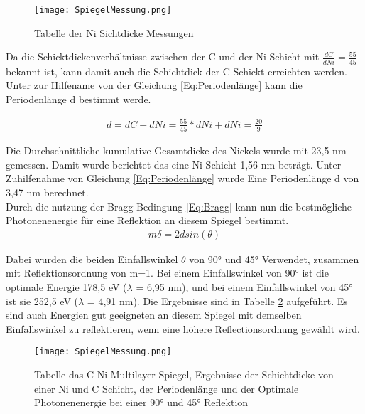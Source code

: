 \begin{figure}[h]
 \centering
 \texttt{[image: SpiegelMessung.png]}
 \caption[Tabelle C-Ni Spiegel]{Tabelle der Ni Sichtdicke Messungen}
 \label{fig:TabelleSpiegelMessung}
\end{figure}

Da die Schicktdickenverhältnisse zwischen der C und der Ni Schicht mit $\displaystyle\frac{dC}{dNi} = \displaystyle\frac{55}{45}$ bekannt ist, kann damit auch die Schichtdick der C Schickt erreichten werden. Unter zur Hilfename von der Gleichung \ref{Eq:Periodenlänge} kann die Periodenlänge d bestimmt werde.

\begin{align}
\label{Eq:Periodenlänge}
  d = dC + dNi =  \displaystyle\frac{55}{45}*dNi+dNi = \displaystyle\frac{20}{9}
\end{align}

Die Durchschnittliche kumulative Gesamtdicke des Nickels wurde mit 23,5 nm gemessen. Damit wurde berichtet das eine Ni Schicht 1,56 nm beträgt. Unter Zuhilfenahme von Gleichung \ref{Eq:Periodenlänge} wurde Eine Periodenlänge d von 3,47 nm berechnet.\\
Durch die nutzung der Bragg Bedingung \ref{Eq:Bragg} kann nun die bestmögliche Photonenenergie für eine Reflektion an diesem Spiegel bestimmt. \\

\begin{align}
\label{Eq:Bragg}
    m\delta = 2 d sin(\theta)
\end{align}

Dabei wurden die beiden Einfallswinkel $\theta$ von 90° und 45° Verwendet, zusammen mit Reflektionsordnung von m=1.  Bei einem Einfallswinkel von 90° ist die optimale Energie 178,5 eV ($\lambda$ = 6,95 nm), und bei einem Einfallswinkel von 45° ist sie 252,5 eV ($\lambda$ = 4,91 nm). Die Ergebnisse sind in Tabelle \ref{fig:TabelleSpiegelErgebisse} aufgeführt. Es sind auch Energien gut geeigneten an diesem Spiegel mit demselben Einfallswinkel zu reflektieren, wenn eine höhere Reflectionsordnung gewählt wird.\\
\begin{figure}[h]
 \centering
 \texttt{[image: SpiegelMessung.png]}
 \caption[Tabelle C-Ni Spiegel]{Tabelle das C-Ni Multilayer Spiegel, Ergebnisse der Schichtdicke von einer Ni und C Schicht, der  Periodenlänge und der Optimale Photonenenergie bei einer 90° und 45° Reflektion}
 \label{fig:TabelleSpiegelErgebisse}
\end{figure}


